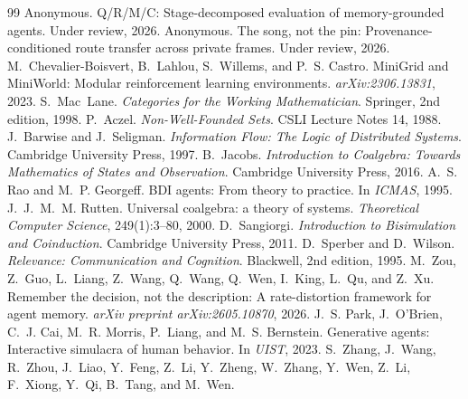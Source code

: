 \documentclass{article}
\begin{document}
\begin{thebibliography}{99}
Anonymous.
\newblock Q/R/M/C: Stage-decomposed evaluation of memory-grounded agents.
\newblock Under review, 2026.
Anonymous.
\newblock The song, not the pin: Provenance-conditioned route transfer across private frames.
\newblock Under review, 2026.
M.~Chevalier-Boisvert, B.~Lahlou, S.~Willems, and P.~S. Castro.
\newblock MiniGrid and MiniWorld: Modular reinforcement learning environments.
\newblock \emph{arXiv:2306.13831}, 2023.
S.~Mac~Lane.
\newblock \emph{Categories for the Working Mathematician}.
\newblock Springer, 2nd edition, 1998.
P.~Aczel.
\newblock \emph{Non-Well-Founded Sets}.
\newblock CSLI Lecture Notes 14, 1988.
J.~Barwise and J.~Seligman.
\newblock \emph{Information Flow: The Logic of Distributed Systems}.
\newblock Cambridge University Press, 1997.
B.~Jacobs.
\newblock \emph{Introduction to Coalgebra: Towards Mathematics of States and Observation}.
\newblock Cambridge University Press, 2016.
A.~S. Rao and M.~P. Georgeff.
\newblock BDI agents: From theory to practice.
\newblock In \emph{ICMAS}, 1995.
J.~J.~M.~M. Rutten.
\newblock Universal coalgebra: a theory of systems.
\newblock \emph{Theoretical Computer Science}, 249(1):3--80, 2000.
D.~Sangiorgi.
\newblock \emph{Introduction to Bisimulation and Coinduction}.
\newblock Cambridge University Press, 2011.
D.~Sperber and D.~Wilson.
\newblock \emph{Relevance: Communication and Cognition}.
\newblock Blackwell, 2nd edition, 1995.
M.~Zou, Z.~Guo, L.~Liang, Z.~Wang, Q.~Wang, Q.~Wen, I.~King, L.~Qu, and Z.~Xu.
\newblock Remember the decision, not the description: A
rate-distortion framework for agent memory.
\newblock \emph{arXiv preprint arXiv:2605.10870}, 2026.
J.~S. Park, J.~O'Brien, C.~J. Cai, M.~R. Morris, P.~Liang, and
M.~S. Bernstein.
\newblock Generative agents: Interactive simulacra of human behavior.
\newblock In \emph{UIST}, 2023.
S.~Zhang, J.~Wang, R.~Zhou, J.~Liao, Y.~Feng, Z.~Li, Y.~Zheng, W.~Zhang, Y.~Wen, Z.~Li, F.~Xiong, Y.~Qi, B.~Tang, and M.~Wen.

\end{thebibliography}
\end{document}

